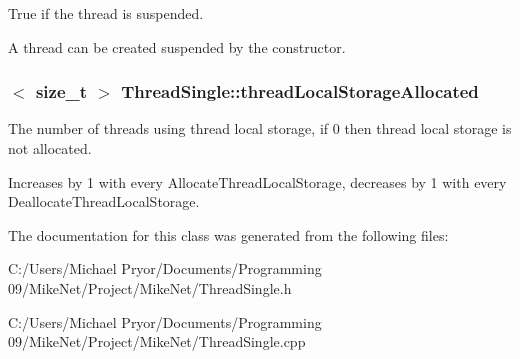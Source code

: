 True if the thread is suspended. 

A thread can be created suspended by the constructor. \hypertarget{class_thread_single_a090d0d230358aa18cff5ace35ac2f4b3}{
\subsubsection[{threadLocalStorageAllocated}]{$<$ size\_\-t $>$ {\bf ThreadSingle::threadLocalStorageAllocated}}}
\label{class_thread_single_a090d0d230358aa18cff5ace35ac2f4b3}


The number of threads using thread local storage, if 0 then thread local storage is not allocated. 

Increases by 1 with every AllocateThreadLocalStorage, decreases by 1 with every DeallocateThreadLocalStorage. 

The documentation for this class was generated from the following files:\begin{DoxyCompactItemize}
\item 
C:/Users/Michael Pryor/Documents/Programming 09/MikeNet/Project/MikeNet/ThreadSingle.h\item 
C:/Users/Michael Pryor/Documents/Programming 09/MikeNet/Project/MikeNet/ThreadSingle.cpp\end{DoxyCompactItemize}
